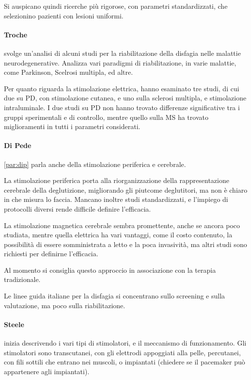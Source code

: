 Si auspicano quindi ricerche più rigorose, con parametri standardizzati, che 
selezionino pazienti con lesioni uniformi.

\paragraph{Troche} \label{par:tro} \cite{Troche2017} svolge un'analisi di 
alcuni studi per la riabilitazione della disfagia nelle malattie 
neurodegenerative.
Analizza vari paradigmi di riabilitazione, in varie malattie, come Parkinson, 
Scelrosi multipla, ed altre.

Per quanto riguarda la stimolazione elettrica, hanno esaminato tre studi, di 
cui due su PD, con stimolazione cutanea, e uno sulla sclerosi multipla, e 
stimolazione intraluminale.
I due studi su PD non hanno trovato differenze significative tra i gruppi 
sperimentali e di controllo, mentre quello sulla MS ha trovato miglioramenti in 
tutti i parametri considerati.

\paragraph{Di Pede} \ref{par:dip} \cite{DiPede2015} parla anche della 
stimolazione periferica e cerebrale.

La stimolazione periferica porta alla riorganizzazione della rappresentazione 
cerebrale della deglutizione, migliorando gli piutcome deglutitori, ma non è 
chiaro in che misura lo faccia.
Mancano inoltre studi standardizzati, e l'impiego di protocolli diversi rende 
difficile definire l'efficacia.

La stimolazione magnetica cerebrale sembra promettente, anche se ancora poco 
studiata, mentre quella elettrica ha vari vantaggi, come il costo contenuto, la 
possibilità di essere somministrata a letto e la poca invasività, ma altri 
studi sono richiesti per definirne l'efficacia.

Al momento si consiglia questo approccio in associazione con la terapia 
tradizionale.

Le linee guida italiane per la disfagia si concentrano sullo screening e sulla 
valutazione, ma poco sulla riabilitazione.

\paragraph{Steele}\cite{Steele2007} \label{par:ste}  inizia descrivendo i vari 
tipi di stimolatori, e il meccanismo di funzionamento.
Gli stimolatori sono transcutanei, con gli elettrodi appoggiati alla pelle, 
percutanei, con fili sottili che entrano nei muscoli, o impiantati (chiedere se 
il pacemaker può appartenere agli impiantati).

